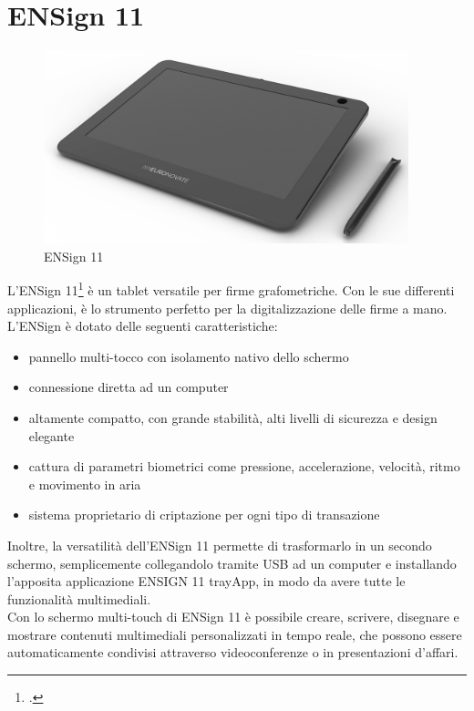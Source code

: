 \section{ENSign 11}

\begin{figure}[!h] 
    \centering 
    \includegraphics[width=300pt]{images/ensign11.png} 
    \caption{ENSign 11}
    \label{fig:ens11}
\end{figure}

L'ENSign 11\footcite{site:ensign11} è un tablet versatile per firme grafometriche. Con le sue differenti applicazioni, è lo strumento perfetto per la digitalizzazione delle firme a mano.\\
L'ENSign è dotato delle seguenti caratteristiche:
\begin{itemize}
    \item pannello multi-tocco con isolamento nativo dello schermo
    \item connessione diretta ad un computer
    \item altamente compatto, con grande stabilità, alti livelli di sicurezza e design elegante
    \item cattura di parametri biometrici come pressione, accelerazione, velocità, ritmo e movimento in aria
    \item sistema proprietario di criptazione per ogni tipo di transazione
\end{itemize}
Inoltre, la versatilità dell'ENSign 11 permette di trasformarlo in un secondo schermo, semplicemente collegandolo tramite USB ad un computer e installando l'apposita applicazione ENSIGN 11 trayApp, in modo da avere tutte le funzionalità multimediali.\\
Con lo schermo multi-touch di ENSign 11 è possibile creare, scrivere, disegnare e mostrare contenuti multimediali personalizzati in tempo reale, che possono essere automaticamente condivisi attraverso videoconferenze o in presentazioni d'affari.

